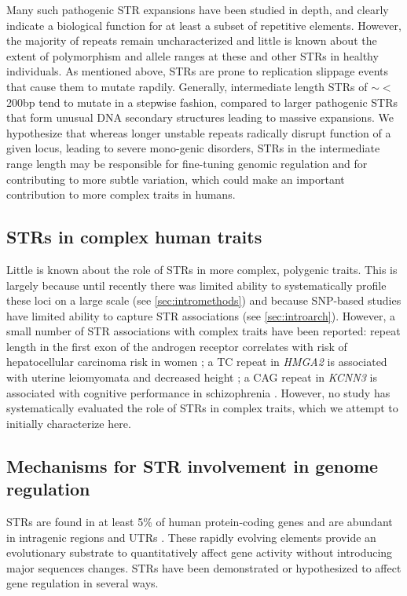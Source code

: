 Many such pathogenic STR expansions have been studied in depth, and clearly indicate a biological function for at least a subset of repetitive elements. However, the majority of repeats remain uncharacterized and little is known about the extent of polymorphism and allele ranges at these and other STRs in healthy individuals. As mentioned above, STRs are prone to replication slippage events that cause them to mutate rapdily. Generally, intermediate length STRs of $\sim<$200bp tend to mutate in a stepwise fashion, compared to larger pathogenic STRs that form unusual DNA secondary structures leading to massive expansions. We hypothesize that whereas longer unstable repeats radically disrupt function of a given locus, leading to severe mono-genic disorders, STRs in the intermediate range length may be responsible for fine-tuning genomic regulation and for contributing to more subtle variation, which could make an important contribution to more complex traits in humans.

\subsection{STRs in complex human traits}
Little is known about the role of STRs in more complex, polygenic traits. This is largely because until recently there was limited ability to systematically profile these loci on a large scale (see \ref{sec:intromethods}) and because SNP-based studies have limited ability to capture STR associations (see \ref{sec:introarch}). However, a small number of STR associations with complex traits have been reported: repeat length in the first exon of the androgen receptor correlates with risk of hepatocellular carcinoma risk in women \cite{YuYangYangEtAl2002}; a TC repeat in \emph{HMGA2} is associated with uterine leiomyomata and decreased height \cite{HodgeTCuencoHuyckEtAl2009}; a CAG repeat in \emph{KCNN3} is associated with cognitive performance in schizophrenia \cite{GrubeGerchenAdamcioEtAl2011}. However, no study has systematically evaluated the role of STRs in complex traits, which we attempt to initially characterize here.

\subsection{Mechanisms for STR involvement in genome regulation}
STRs are found in at least 5\% of human protein-coding genes \cite{ODushlaineEdwardsParkEtAl2005} and are abundant in intragenic regions and UTRs \cite{LiKorolFahimaEtAl2004}. These rapidly evolving elements provide an evolutionary substrate to quantitatively affect gene activity without introducing major sequences changes. STRs have been demonstrated or hypothesized to affect gene regulation in several ways.

